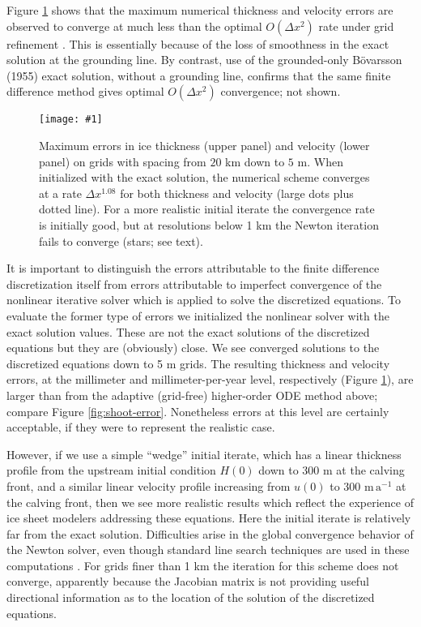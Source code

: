 \documentclass[twocolumn]{igs}
\renewcommand{\dh}{\fontencoding{T1}\selectfont{\symbol{240}}}
\newcommand{\onecol}[1]{\texttt{[image: \#1]}}
\newcommand{\citebod}{B\"o\dh varsson (1955)\nocite{Bodvardsson}\xspace}
\begin{document}
Figure \ref{fig:convmarine} shows that the maximum numerical thickness and velocity errors are observed to converge at much less than the optimal $O(\Delta x^2)$ rate under grid refinement \citep{MortonMayers}.  This is essentially because of the loss of smoothness in the exact solution at the grounding line.  By contrast, use of the grounded-only \citebod exact solution, without a grounding line, confirms that the same finite difference method gives optimal $O(\Delta x^2)$ convergence; not shown.

\begin{figure}[ht]
\onecol{convmarine}
\caption{Maximum errors in ice thickness (upper panel) and velocity (lower panel) on grids with spacing from $20$ km down to $5$ m.  When initialized with the exact solution, the numerical scheme converges at a rate $\Delta x^{1.08}$ for both thickness and velocity (large dots plus dotted line).  For a more realistic initial iterate the convergence rate is initially good, but at resolutions below 1 km the Newton iteration fails to converge (stars; see text).} \label{fig:convmarine}
\end{figure}

It is important to distinguish the errors attributable to the finite difference discretization itself from errors attributable to imperfect convergence of the nonlinear iterative solver which is applied to solve the discretized equations.  To evaluate the former type of errors we initialized the nonlinear solver with the exact solution values.  These are not the exact solutions of the discretized equations but they are (obviously) close.  We see converged solutions to the discretized equations down to 5 m grids.  The resulting thickness and velocity errors, at the millimeter and millimeter-per-year level, respectively (Figure \ref{fig:convmarine}), are larger than from the adaptive (grid-free) higher-order ODE method above; compare Figure \ref{fig:shoot-error}.  Nonetheless errors at this level are certainly acceptable, if they were to represent the realistic case.

However, if we use a simple ``wedge'' initial iterate, which has a linear thickness profile from the upstream initial condition $H(0)$ down to 300 m at the calving front, and a similar linear velocity profile increasing from $u(0)$ to 300 $\text{m}\,\text{a}^{-1}$ at the calving front, then we see more realistic results which reflect the experience of ice sheet modelers addressing these equations.  Here the initial iterate is relatively far from the exact solution.  Difficulties arise in the global convergence behavior of the Newton solver, even though standard line search techniques are used in these computations \citep{Kelley}.  For grids finer than 1 km the iteration for this scheme does not converge, apparently because the Jacobian matrix is not providing useful directional information as to the location of the solution of the discretized equations.
\end{document}
